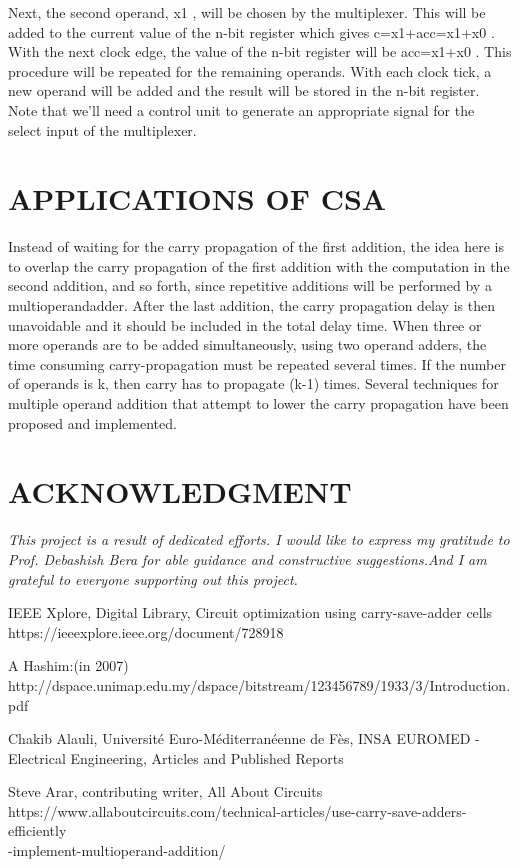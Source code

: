 \documentclass[12pt]{article}
\begin{document}
Next, the second operand, x1
, will be chosen by the multiplexer. This will be added to the current value of the n-bit register which gives c=x1+acc=x1+x0
. With the next clock edge, the value of the n-bit register will be acc=x1+x0
. This procedure will be repeated for the remaining operands. With each clock tick, a new operand will be added and the result will be stored in the n-bit register. Note that we’ll need a control unit to generate an appropriate signal for the select input of the multiplexer.\cite{Addition}
\section{APPLICATIONS OF CSA}
Instead of waiting for the carry propagation of the first addition, the idea here is to overlap the carry propagation of the first addition with the computation in the second addition,  and  so  forth,  since  repetitive  additions  will  be  performed  by  a  multioperandadder.  After  the  last  addition,  the  carry  propagation  delay  is  then  unavoidable  and  it  should be included in the total delay time.  When three or more operands are to be added simultaneously, using two operand adders,  the  time  consuming  carry-propagation  must  be  repeated  several  times.  If  the  number of operands is k, then carry has to propagate (k-1) times. Several techniques for multiple  operand  addition  that  attempt  to  lower  the  carry  propagation  have  been  proposed and implemented. 
\section*{ACKNOWLEDGMENT}
\textit{This project is a result of dedicated efforts. I would like to express my gratitude to Prof. Debashish Bera for able guidance and constructive suggestions.And I am grateful to everyone supporting out this project.}

\begin{thebibliography}{}
IEEE Xplore, Digital Library, Circuit optimization using carry-save-adder cells\\https://ieeexplore.ieee.org/document/728918

 A Hashim:(in 2007)\\http://dspace.unimap.edu.my/dspace/bitstream/123456789/1933/3/Introduction.pdf

 Chakib Alauli, Université Euro-Méditerranéenne de Fès, INSA EUROMED - Electrical Engineering, Articles and Published Reports

 Steve Arar, contributing writer, All About Circuits\\
https://www.allaboutcircuits.com/technical-articles/use-carry-save-adders-efficiently\\-implement-multioperand-addition/


\end{thebibliography}
\end{document}
